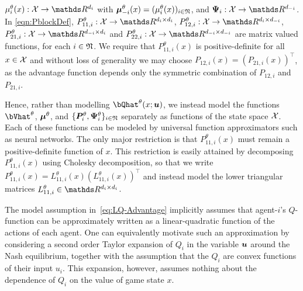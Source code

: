 \documentclass[onefignum,onetabnum]{siamonline171218}
\begin{document}
$\mu^{\theta}_i(x) : \X \rightarrow \R^{d_i}$ with $\bm{\mu}^{\theta}_{-i}(x) = (\mu^{\theta}_i(x))_{i\in{\mathfrak{N}}}$, and  $\bPsi_i:\X\rightarrow\R^{d_{-i}}$.
In \eqref{eqn:PblockDef},  $P^{\theta}_{11,i} : \X \rightarrow \R^{d_i \times d_i}$,  $P^{\theta}_{12,i} : \X \rightarrow \R^{d_{i} \times d_{-i}}$, $P^{\theta}_{21,i} : \X \rightarrow \R^{d_{-i} \times d_{i}}$ and $P^{\theta}_{22,i} : \X \rightarrow \R^{d_{-i} \times d_{-i}}$ are matrix valued functions, for each $i\in{\mathfrak{N}}$. We require that  $P^{\theta}_{11,i}(x)$ is positive-definite for all $x\in\mathcal{X}$ and without loss of generality we may choose $P_{12,i}(x) = \left(P_{21,i}(x)\right)^\intercal$, as the advantage function depends only the symmetric combination of $P_{12,i}$ and $P_{21,i}$.

Hence, rather than modelling $\bQhat^\theta (x;\bu)$, we instead model the functions $\bVhat^\theta$, $\bm{\mu}^{\theta}$, and $\{\bm{P}^\theta_{i}, \bm{\Psi}_i^{\theta} \}_{i\in{\mathfrak{N}}}$ separately as functions of the state space $\mathcal{X}$. Each of these functions can be modeled by  universal function approximators such as neural networks. The only major restriction is that  $P_{11,i}^{\theta}(x)$ must remain a positive-definite function of $x$. This restriction is easily attained by decomposing $P_{11,i}^{\theta}(x)$ using  Cholesky decomposition, so that we write $P_{11,i}^{\theta}(x) = L_{11,i}^{\theta}(x) (L_{11,i}^{\theta}(x))^{\intercal}$ and instead model the lower triangular matrices $L_{11,i}^{\theta}\in\R^{d_{i}\times d_{i}}$.

The model assumption in~\eqref{eq:LQ-Advantage} implicitly assumes that agent-$i$'s $Q$-function  can be approximately written as a linear-quadratic function of the actions of each agent. One can equivalently motivate such an approximation by considering a second order Taylor expansion of  $Q_i$ in the variable ${\bm{u}}$ around the Nash equilibrium, together with the assumption that the $Q_i$ are convex functions of their input $u_i$. This expansion, however, assumes nothing about the dependence of  $Q_i$ on the value of game state $x$.
\end{document}
